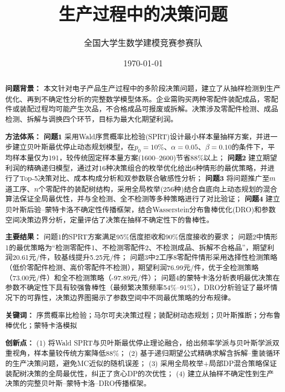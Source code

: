 \documentclass[12pt,a4paper]{ctexart}
\title{\textbf{\heiti\zihao{2} 生产过程中的决策问题}}
\author{\fangsong 全国大学生数学建模竞赛参赛队}
\date{\today}
\begin{document}
\maketitle

\begin{abstract}
\noindent \textbf{问题背景：} 本文针对电子产品生产过程中的多阶段决策问题，建立了从抽样检测到生产优化、再到不确定性分析的完整数学模型体系。企业需购买两种零配件装配成品，零配件或装配过程均可能产生次品，不合格成品可报废或拆解。决策涉及零配件检测、成品检测、拆解与调换四个环节，目标为最大化期望利润。

\noindent \textbf{方法体系：}
\textbf{问题1} 采用Wald序贯概率比检验(SPRT)设计最小样本量抽样方案，并进一步建立贝叶斯最优停止动态规划模型，在$p_0=10\%$、$\alpha=0.05$、$\beta=0.10$的条件下，平均样本量仅为191，较传统固定样本量方案(1600--2600)节省88\%以上；
\textbf{问题2} 建立期望利润的精确递归模型，通过对16种决策组合的枚举优化给出6种情形的最优策略，并进行了Top-5决策对比、成本构成分析和双参数联合敏感性分析；
\textbf{问题3} 将问题推广至$m$道工序、$n$个零配件的装配树结构，采用全局枚举(256种)结合自底向上动态规划的混合算法保证全局最优性，并与全检测、全不检测等多种策略进行了对比验证；
\textbf{问题4} 建立贝叶斯后验--蒙特卡洛不确定性传播框架，结合Wasserstein分布鲁棒优化(DRO)和参数空间决策边界分析，定量评估了决策在抽样不确定性下的鲁棒性。

\noindent \textbf{主要结果：}
问题1的SPRT方案满足95\%信度拒收和90\%信度接收的要求；
问题2中情形1的最优策略为``检测零配件1、不检测零配件2、不检测成品、拆解不合格品''，期望利润20.61元/件，较基线提升5.25元/件；
问题3中2工序8零配件情形采用选择性检测策略（低价零配件检测、高价零配件不检测），期望利润76.99元/件，优于全检测策略（73.00元/件）和全不检测策略（-97.89元/件）；
问题4的蒙特卡洛分析表明最优决策在参数不确定性下具有较强鲁棒性（最频繁决策频率54\%--91\%），DRO分析验证了最坏情况下的可靠性，决策边界图揭示了参数空间中不同最优策略的分布规律。

\noindent \textbf{关键词：} 序贯概率比检验；马尔可夫决策过程；装配树动态规划；贝叶斯推断；分布鲁棒优化；蒙特卡洛模拟

\noindent \textbf{创新点：}
(1) 将Wald SPRT与贝叶斯最优停止理论融合，给出频率学派与贝叶斯学派双重视角，样本量较传统方案降低88\%；
(2) 基于递归期望公式精确求解含拆解--重装循环的生产决策问题，避免MC近似的随机误差；
(3) 采用全局枚举+局部DP混合策略保证装配树决策的全局最优性，纠正了贪心DP的次优性；
(4) 建立从抽样不确定性到生产决策的完整贝叶斯--蒙特卡洛--DRO传播框架。

\end{abstract}
\end{document}
